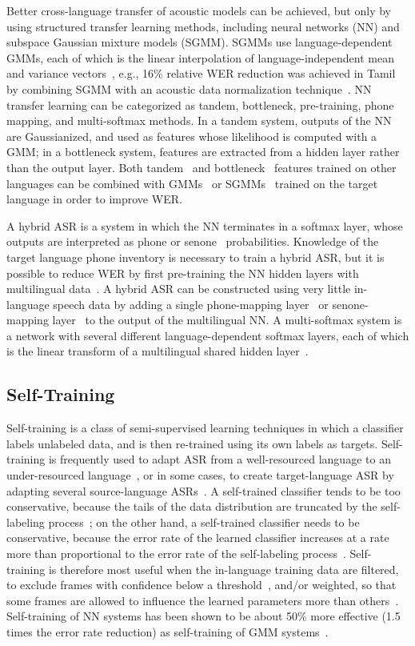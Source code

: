 Better cross-language transfer of acoustic models can be achieved, but
only by using structured transfer learning methods, including neural
networks (NN) and subspace Gaussian mixture models (SGMM).  SGMMs use
language-dependent GMMs, each of which is the linear interpolation of
language-independent mean and variance vectors~\cite{Povey2011}, e.g.,
16\% relative WER reduction was achieved in Tamil by combining SGMM
with an acoustic data normalization technique~\cite{Mohan2014}.  NN
transfer learning can be categorized as tandem, bottleneck,
pre-training, phone mapping, and multi-softmax methods.  In a tandem
system, outputs of the NN are Gaussianized, and used as features whose
likelihood is computed with a GMM; in a
bottleneck system, features are extracted from a hidden layer rather
than the output layer. Both tandem~\cite{Stolcke2006} and
bottleneck~\cite{Vesely2012} features trained on other languages can
be combined with GMMs~\cite{Vesely2012} or SGMMs~\cite{Imseng2014}
trained on the target language in order to improve WER.

A hybrid ASR is a system in which the NN terminates in a softmax
layer, whose outputs are interpreted as phone or
senone~\cite{Dahl2012} probabilities.  Knowledge of the target
language phone inventory is necessary to train a hybrid ASR, but it is
possible to reduce WER by first pre-training the NN hidden layers with
multilingual data~\cite{Huang2013,Swietojanski2012}.  A hybrid ASR can be
constructed using very little in-language speech data by adding a
single phone-mapping layer~\cite{Sim2008} or senone-mapping layer~\cite{Do2012}
to the output of the multilingual NN.  A multi-softmax system
is a network with several different language-dependent softmax
layers, each of which is the linear transform of a multilingual shared
hidden layer~\cite{Huang2013,Scanzio2008,Vesely2012}.

\subsection{Self-Training}

Self-training is a class of semi-supervised learning techniques in
which a classifier labels unlabeled data, and is then
re-trained using its own labels as targets.  Self-training is
frequently used to adapt ASR from a well-resourced language to an
under-resourced language~\cite{Loof2009,Cetin2008}, or in some cases,
to create target-language ASR by adapting several source-language
ASRs~\cite{Vu2011b}.  A self-trained classifier tends to be too
conservative, because the tails of the data distribution are truncated
by the self-labeling process~\cite{Scudder1965}; on the other hand, a
self-trained classifier needs to be conservative, because the error
rate of the learned classifier increases at a rate more than
proportional to the error rate of the self-labeling
process~\cite{Huang2013b}.  Self-training is therefore most useful
when the in-language training data are filtered, to exclude
frames with confidence below a threshold~\cite{vesely2013-semi},
and/or weighted, so that some frames are allowed to influence the
learned parameters more than others~\cite{Hsiao2013}.  Self-training
of NN systems has been shown to be about 50\% more effective (1.5
times the error rate reduction) as self-training of GMM
systems~\cite{Huang2013b}.
